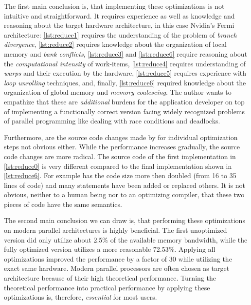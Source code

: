 The first main conclusion is, that implementing these optimizations is not intuitive and straightforward.
It requires experience as well as knowledge and reasoning about the target hardware architecture, in this case Nvidia's Fermi \GPU architecture:
\autoref{lst:reduce1} requires the understanding of the problem of \emph{branch divergence}, \autoref{lst:reduce2} requires knowledge about the organization of local memory and \emph{bank conflicts}, \autoref{lst:reduce3} and \autoref{lst:reduce6} require reasoning about the \emph{computational intensity} of work-items, \autoref{lst:reduce4} requires understanding of \emph{warps} and their execution by the hardware, \autoref{lst:reduce5} requires experience with \emph{loop unrolling} techniques, and, finally, \autoref{lst:reduce6} required knowledge about the organization of global memory and \emph{memory coalescing}.
The author wants to empathize that these are \emph{additional} burdens for the application developer on top of implementing a functionally correct version facing widely recognized problems of parallel programming like dealing with race conditions and deadlocks.

Furthermore, are the source code changes made by for individual optimization steps not obvious either.
While the performance increases gradually, the source code changes are more radical.
The source code of the first implementation in \autoref{lst:reduce0} is very different compared to the final implementation shown in \autoref{lst:reduce6}.
For example has the code size more then doubled (from 16 to 35 lines of code) and many statements have been added or replaced others.
It is not obvious, neither to a human being nor to an optimizing compiler, that these two pieces of code have the same semantics.

The second main conclusion we can draw is, that performing these optimizations on modern parallel architectures is highly beneficial.
The first unoptimized version did only utilize about 2.5\% of the available memory bandwidth, while the fully optimized version utilizes a more reasonable 72.53\%.
Applying all optimizations improved the performance by a factor of $30$ while utilizing the exact same hardware.
Modern parallel processors are often chosen as target architecture because of their high theoretical performance.
Turning the theoretical performance into practical performance by applying these optimizations is, therefore, \emph{essential} for most users.





